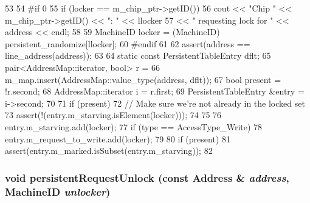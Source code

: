 \begin{DoxyCode}
53 {
54 #if 0
55     if (locker == m_chip_ptr->getID())
56         cout << "Chip " << m_chip_ptr->getID() << ": " << llocker
57              << " requesting lock for " << address << endl;
58 
59     MachineID locker = (MachineID) persistent_randomize[llocker];
60 #endif
61 
62     assert(address == line_address(address));
63 
64     static const PersistentTableEntry dflt;
65     pair<AddressMap::iterator, bool> r =
66         m_map.insert(AddressMap::value_type(address, dflt));
67     bool present = !r.second;
68     AddressMap::iterator i = r.first;
69     PersistentTableEntry &entry = i->second;
70 
71     if (present) {
72         // Make sure we're not already in the locked set
73         assert(!(entry.m_starving.isElement(locker)));
74     }
75 
76     entry.m_starving.add(locker);
77     if (type == AccessType_Write)
78         entry.m_request_to_write.add(locker);
79 
80     if (present)
81         assert(entry.m_marked.isSubset(entry.m_starving));
82 }
\end{DoxyCode}
\hypertarget{classPersistentTable_a9b62725c7279882365ff19efb985b035}{
\subsubsection[{persistentRequestUnlock}]{\setlength{\rightskip}{0pt plus 5cm}void persistentRequestUnlock (const {\bf Address} \& {\em address}, \/  {\bf MachineID} {\em unlocker})}}
\label{classPersistentTable_a9b62725c7279882365ff19efb985b035}



